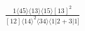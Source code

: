 \documentclass[varwidth, border=5pt]{standalone}
\begin{document}
\begin{my}
$\begin{gathered}
\scriptscriptstyle\frac{1⟨45⟩⟨13⟩⟨15⟩[13]^2}{[12]⟨14⟩^2⟨34⟩⟨1|2+3|1]}
\end{gathered}$
\end{my}
\end{document}
